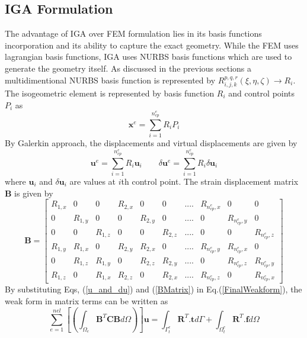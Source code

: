 \documentclass[11pt]{article}
\begin{document}
\subsection{IGA Formulation}
The advantage of IGA over FEM formulation lies in its basis functions
incorporation and its ability to capture the exact geometry. While the FEM uses
lagrangian basis functions, IGA uses NURBS basis functions which are used to
generate the geometry itself. As discussed in the previous sections a
multidimentional NURBS basis function is represented by
$R_{i,j,k}^{p,q,r}(\xi,\eta,\zeta) \rightarrow R_i$. The isogeometric element 
is represented by basis function $R_i$ and control points $P_i$ as
\begin{equation} \label{Co-ordinate}
\textbf{x}^e = \sum_{i=1}^{n_{cp}^e} R_i P_i
\end{equation} 
By Galerkin approach, the displacements and virtual displacements are given by
\begin{equation} \label{u_and_du}
\textbf{u}^e = \sum_{i=1}^{n_{cp}^e} R_i \textbf{u}_i \qquad \delta\textbf{u}^e
= \sum_{i=1}^{n_{cp}^e} R_i \delta\textbf{u}_i
\end{equation}
where $\textbf{u}_i$ and $\delta\textbf{u}_i$ are values at $i$th control point.
The strain displacement matrix \textbf{B} is given by
\begin{equation} \label{BMatrix}
\textbf{B} =
\begin{bmatrix}
R_{1,x} & 0 & 0 & R_{2,x} & 0 & 0 & .... & R_{n_{cp}^e,x} & 0 & 0 \\
0 &R_{1,y} & 0 & 0 & R_{2,y} & 0 & .... & 0 & R_{n_{cp}^e,y} & 0  \\
0 & 0 & R_{1,z} &0 & 0 & R_{2,z} & .... &0 & 0 & R_{n_{cp}^e,z}  \\
R_{1,y} & R_{1,x} & 0 & R_{2,y} & R_{2,x} & 0 & .... & R_{n_{cp}^e,y} &
R_{n_{cp}^e,x} & 0 \\
0 & R_{1,z} & R_{1,y} & 0 & R_{2,z} & R_{2,y} & .... & 0 & R_{n_{cp}^e,z} &
R_{n_{cp}^e,y}\\
R_{1,z} &0 & R_{1,x} & R_{2,z} &0 & R_{2,x} & .... &R_{n_{cp}^e,z} &0
&R_{n_{cp}^e,x}
\end{bmatrix}
\end{equation}
By substituting Eqs, (\ref{u_and_du}) and (\ref{BMatrix}) in
Eq.(\ref{FinalWeakform}), the weak form in matrix terms can be written as
\begin{equation} \label{MatrixWeakForm}
\sum_{e=1}^{nel} \left[ \left( \int_{\Omega_e} \textbf{B}^T \textbf{C}
\textbf{B} d\Omega \right) \right] \textbf{u} = \int_{\Gamma^e_t}
\textbf{R}^T.\textbf{t} d\Gamma + \int_{\Omega^e_t} \textbf{R}^T.\textbf{f}
d\Omega 
\end{equation}
\end{document}
